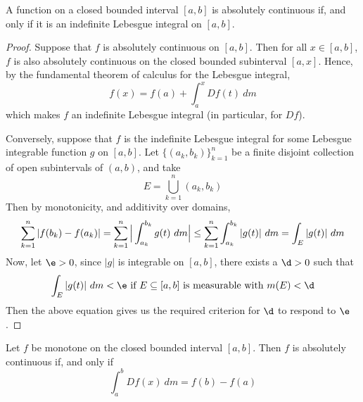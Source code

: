 \begin{theorem}\label{11.4.2}
    A function on a closed bounded interval $[a,b]$ is absolutely continuous if,
    and only if it is an indefinite Lebesgue integral on $[a,b]$.
\end{theorem}
\begin{proof}
    Suppose that $f$ is absolutely continuous on  $[a,b]$. Then for all $x \in
    [a,b]$, $f$ is also absolutely continuous on the closed bounded subinterval
     $[a,x]$. Hence, by the fundamental theorem of calculus for the Lebesgue
     integral,
     \begin{equation*}
         f(x)=f(a)+\int_a^x{D{f(t)} \ dm}
     \end{equation*}
     which makes $f$ an indefinite Lebesgue integral (in particular, for $D{f}$).

     Conversely, suppose that $f$ is the indefinite Lebesgue integral for some
     Lebesgue integrable function $g$ on $[a,b]$. Let $\{(a_k,b_k)\}_{k=1}^n$ be
     a finite disjoint collection of open subintervals of $(a,b)$, and take
     \begin{equation*}
         E=\bigcup_{k=1}^n{(a_k,b_k)}
     \end{equation*}
     Then by monotonicity, and additivity over domains,
     \begin{equation*}
         \sum_{k=1}^n{|f(b_k)-f(a_k)|}=
         \sum_{k=1}^n{\Big{|} \int_{a_k}^{b_k}{g(t) \ dm} \Big{|}} \leq
         \sum_{k=1}^n{\int_{a_k}^{b_k}{|g(t)| \ dm}}=\int_E{|g(t)| \ dm}
     \end{equation*}
     Now, let $\e>0$, since  $|g|$ is integrable on  $[a,b]$, there exists a
     $\d>0$ such that
     \begin{equation*}
         \int_E{|g(t)| \ dm}<\e \text{ if } E \subseteq [a,b] \text{ is
         measurable with } m(E)<\d
     \end{equation*}
     Then the above equation gives us the required criterion for $\d$ to respond
     to  $\e$.
\end{proof}
\begin{corollary}
    Let $f$ be monotone on the closed bounded interval  $[a,b]$. Then $f$ is
    absolutely continuous if, and only if
    \begin{equation*}
        \int_a^b{D{f(x)} \ dm}=f(b)-f(a)
    \end{equation*}
\end{corollary}
